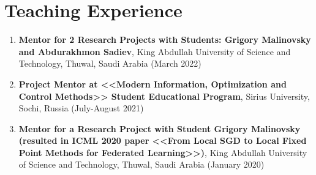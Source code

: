 \section{Teaching Experience}

\newcommand{\teaching}[3]{{\bf #1}, #2 (#3)}

\begin{enumerate}
	\item \teaching{Mentor for 2 Research Projects with Students: Grigory Malinovsky and Abdurakhmon Sadiev}{King Abdullah University of Science and Technology, Thuwal, Saudi Arabia}{March 2022}
	
	
	\item \teaching{Project Mentor at <<Modern Information, Optimization and Control Methods>> Student Educational Program}{Sirius University, Sochi, Russia}{July-August 2021}
	
	\item \teaching{Mentor for a Research Project with Student Grigory Malinovsky (resulted in ICML 2020 paper <<From Local SGD to Local Fixed Point Methods for Federated Learning>>)}{King Abdullah University of Science and Technology, Thuwal, Saudi Arabia}{January 2020}
	
	
	
	
	
\end{enumerate}